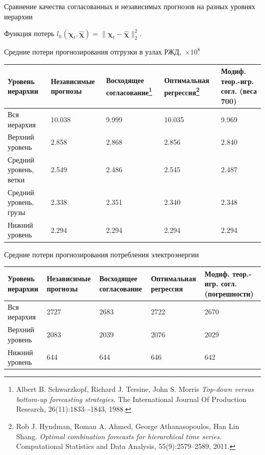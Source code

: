 \documentclass{beamer}
\newcommand{\hchi}{\hat{\boldsymbol{\chi}}}
\begin{document}
\begin{frame}{Сравнение качества согласованных и независимых прогнозов на разных уровнях иерархии}

    Функция потерь $l_h(\boldsymbol{\chi}_t, \hchi) = \| \boldsymbol{\chi}_t - \hchi
    \|^2_2$.
    \vfill

    {\small Средние потери прогнозирования отгрузки в узлах РЖД,~$\times 10^8$}
    \vspace{0.2cm}

    {\tiny
    \begin{tabular}{|p{3cm}|p{1.5cm}|p{1.5cm}|p{1.5cm}|p{2cm}|}
      \hline
      Уровень иерархии &
      Независимые прогнозы &
      Восходящее согласование\footnote{\tiny Albert B. Schwarzkopf, Richard J. Tersine, John S.
        Morris \textit{Top-down versus
        bottom-up forecasting strategies.} The International Journal Of
        Production Research, 26(11):1833–-1843, 1988.} &
      Оптимальная регрессия\footnote{\tiny Rob J. Hyndman, Roman A. Ahmed, George Athanasopoulos, Han Lin Shang. \textit{Optimal
        combination forecasts for hierarchical time series.} Computational
        Statistics and Data Analysis, 55(9):2579–2589, 2011.} &
      Модиф. теор.-игр. согл. (веса 700) \\
      \hline
      Вся иерархия & 10.038 & 9.999 & 10.035  & \textcolor[rgb]{1.00,0.00,0.00}{9.969} \\
      \hline
      Верхний уровень & 2.858 & 2.868 & 2.856 & \textcolor[rgb]{1.00,0.00,0.00}{2.840} \\
      \hline
      Средний уровень, ветки & 2.549 & \textcolor[rgb]{1.00,0.00,0.00}{2.486} & 2.545 & 2.487 \\
      \hline
      Средний уровень, грузы & \textcolor[rgb]{1.00,0.00,0.00}{2.338} & 2.351 & 2.340 & 2.348 \\
      \hline
      Нижний уровень & \textcolor[rgb]{1.00,0.00,0.00}{2.294} & \textcolor[rgb]{1.00,0.00,0.00}{2.294} &
      \textcolor[rgb]{1.00,0.00,0.00}{2.294} & \textcolor[rgb]{1.00,0.00,0.00}{2.294} \\
      \hline
    \end{tabular}}

    \vfill
    {\small Средние потери прогнозирования потребления
    электроэнергии}
    \vspace{0.2cm}

    {\tiny
    \begin{tabular}{|p{3cm}|p{1.5cm}|p{1.5cm}|p{1.5cm}|p{2cm}|}
      \hline
      Уровень иерархии &
      Независимые прогнозы &
      Восходящее согласование &
      Оптимальная регрессия &
      Модиф. теор.-игр. согл. (погрешности) \\
      \hline
      Вся иерархия & 2727 & 2683 & 2722  & \textcolor[rgb]{1.00,0.00,0.00}{2670} \\
      \hline
      Верхний уровень & 2083 & 2039 & 2076 & \textcolor[rgb]{1.00,0.00,0.00}{2029} \\
      \hline
      Нижний уровень & 644 & 644 & 646 & \textcolor[rgb]{1.00,0.00,0.00}{642} \\
      \hline
    \end{tabular}}
\end{frame}
\end{document}
